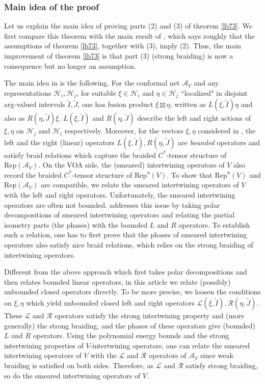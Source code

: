 \documentclass[11pt,b5paper,notitlepage]{article}
\theoremstyle{definition}
\theoremstyle{plain}
\newcommand{\mc}{\mathcal}
\newcommand{\wtd}{\widetilde}
\newcommand{\Rep}{\mathrm{Rep}}
\newcommand{\Repu}{\mathrm{Rep}^{\mathrm u}}
\newcommand{\scr}{\mathscr}
\numberwithin{equation}{subsection}
\begin{document}
\subsubsection*{Main idea of the proof}

Let us explain the main idea of proving parts (2) and (3) of theorem \ref{lb73}. We first compare this theorem with the main result of \cite{Gui21a}, which says roughly that the assumptions of theorem \ref{lb73}, together with (3), imply (2). Thus, the main improvement of theorem \ref{lb73} is that part (3) (strong braiding) is now a consequence but no  longer an assumption. 

The main idea in \cite{Gui21a} is the following. For the conformal net $\mc A_V$ and any representations $\mc H_i,\mc H_j$, for suitable $\xi\in\mc H_i$ and $\eta\in\mc H_j$ ``localized" in disjoint arg-valued intervals $\wtd I,\wtd J$, one has fusion product $\xi\boxtimes\eta$, written as $L(\xi,\wtd I)\eta$ and also as $R(\eta,\wtd J)\xi$. $L(\xi,\wtd I)$ and $R(\eta,\wtd J)$ describe the left and right actions of $\xi,\eta$ on $\mc H_j$ and $\mc H_i$ respectively. Moreover, for the vectors $\xi,\eta$ considered in \cite{Gui21a}, the left and the right (linear) operators $L(\xi,\wtd I),R(\eta,\wtd J)$ are \emph{bounded} operators and satisfy braid relations which capture the braided $C^*$-tensor structure of $\Rep(\mc A_V)$. On the VOA side, the (smeared) intertwining operators of $V$ also record the braided $C^*$-tensor structure of $\Repu(V)$. To show that $\Repu(V)$ and $\Rep(\mc A_V)$ are compatible, we relate the smeared intertwining operators of $V$ with the left and right operators. Unfortunately, the smeared intertwining operators are often not bounded. \cite{Gui21a} addresses this issue by taking polar decompositions of smeared intertwining operators and relating the partial isometry parts (the phases) with the bounded $L$ and $R$ operators. To establish such a relation, one has to first prove that the phases of smeared intertwining operators also satisfy nice braid relations, which relies on  the strong braiding of intertwining operators.




Different from the above approach which first takes polar decompositions and then relates bounded linear operators,  in this article we relate (possibly) unbounded closed operators directly. To be more precise, we loosen the conditions on $\xi,\eta$ which yield unbounded closed left and right operators $\scr L(\xi,\wtd I),\scr R(\eta,\wtd J)$. These $\scr L$ and $\scr R$ operators satisfy the strong intertwining property and (more generally) the strong braiding, and the phases of these operators give (bounded) $L$ and $R$ operators. Using the polynomial energy bounds and the strong intertwining properties of $V$-intertwining operators, one can relate the smeared intertwining operators of $V$ with the $\scr L$ and $\scr R$ operators of $\mc A_V$ since  weak braiding is satisfied on both sides. Therefore, as $\scr L$ and $\scr R$ satisfy strong braiding, so do the smeared intertwining operators  of $V$.
\end{document}
